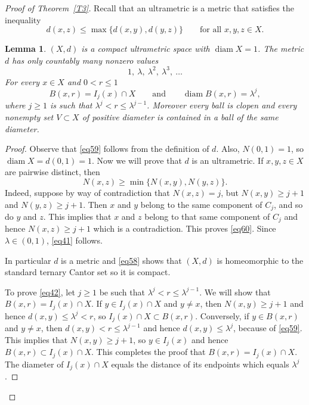 \documentclass[12pt,leqno]{amsart}
\newtheorem{lemma}[theorem]{Lemma}
\theoremstyle{definition}
\def\diam{\operatorname{diam}}
\numberwithin{theorem}{section} \numberwithin{equation}{section}
\begin{document}
\begin{proof}[Proof of Theorem~\ref{T3}]
Recall that an ultrametric is a metric that satisfies the inequality
\begin{equation}
\label{eq41}
d(x,z)\leq \max\{d(x,y),d(y,z)\}
\qquad
\text{for all } x,y,z\in X.
\end{equation}
\begin{lemma}
\label{T10}
$(X,d)$ is a compact ultrametric space with $\diam X=1$.
The metric $d$ has only countably many nonzero values
\begin{equation}
\label{eq59}
1,\ \lambda,\ \lambda^2,\ \lambda^3,\ \dots
\end{equation}
For every $x\in X$ and $0<r\leq 1$
\begin{equation}
\label{eq42}
B(x,r)=I_j(x)\cap X
\qquad
\text{and}
\qquad
\diam B(x,r)=\lambda^j,
\end{equation}
where $j\geq 1$ is such that $\lambda^j<r\leq \lambda^{j-1}$.
Moreover every ball is clopen and every nonempty set $V\subset X$ of positive diameter  is contained in a ball of the same diameter.
\end{lemma}
\begin{proof}
Observe that \eqref{eq59} follows from the definition of $d$.
Also, $N(0,1)=1$, so $\diam X=d(0,1)=1$.
Now we will prove that $d$ is an ultrametric.
If $x,y,z\in X$ are pairwise distinct, then
\begin{equation}
\label{eq60}
 N(x,z)\geq \min\{N(x,y),N(y,z)\}.
\end{equation}
Indeed, suppose by way of contradiction that $N(x,z)=j$, but $N(x,y)\geq j+1$ and $N(y,z)\geq j+1$. 
Then $x$ and $y$ belong to the same component of $C_j$, and so do $y$ and $z$. This implies that $x$ and $z$ belong to that same component of $C_j$ and hence $N(x,z)\geq j+1$ which is a contradiction.
This proves \eqref{eq60}. Since $\lambda\in (0,1)$, \eqref{eq41} follows.

In particular $d$ is a metric and \eqref{eq58} shows that $(X,d)$ is homeomorphic to the standard ternary Cantor set so it is compact.

To prove \eqref{eq42}, let $j\geq 1$ be such that $\lambda^j<r\leq\lambda^{j-1}$. We will show that $B(x,r)=I_j(x)\cap X$. If $y\in I_j(x)\cap X$ and $y\neq x$, then $N(x,y)\geq j+1$ and hence $d(x,y)\leq \lambda^j<r$, so $I_j(x)\cap X\subset B(x,r)$.
Conversely, if $y\in B(x,r)$ and $y\neq x$, then $d(x,y)<r\leq \lambda^{j-1}$ and hence $d(x,y)\leq\lambda^j$, because of \eqref{eq59}. This implies that $N(x,y)\geq j+1$, so $y\in I_j(x)$ and hence $B(x,r)\subset I_j(x)\cap X$. This completes the proof that $B(x,r)= I_j(x)\cap X$. The diameter of $I_j(x)\cap X$ equals the distance of its endpoints which equals $\lambda^j$. 


\end{proof}
\end{proof}
\end{document}
